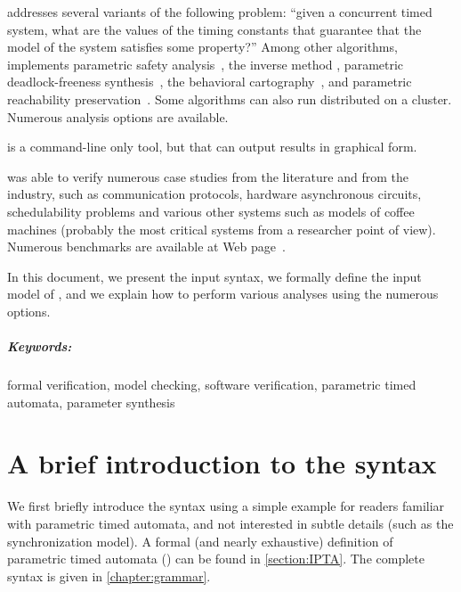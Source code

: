 \imitator{} addresses several variants of the following problem:
``given a concurrent timed system, what are the values of the timing constants that guarantee that the model of the system satisfies some property?''
Among other algorithms, \imitator{} implements
parametric safety analysis~\cite{AHV93,JLR15},
the inverse method \cite{ACEF09,AM15},
parametric deadlock-freeness synthesis~\cite{Andre16},
the behavioral cartography~\cite{AF10},
and
parametric reachability preservation~\cite{ALNS15}.
Some algorithms can also run distributed on a cluster.
Numerous analysis options are available.

\imitator{} is a command-line only tool, but that can output results in graphical form.

\imitator{} was able to verify numerous case studies from the literature and from the industry, such as communication protocols, hardware asynchronous circuits, schedulability problems and various other systems such as models of coffee machines (probably the most critical systems from a researcher point of view).
Numerous benchmarks are available at \imitator{} Web page~\cite{imitator}.

In this document, we present the input syntax, we formally define the input model of \imitator{}, and we explain how to perform various analyses using the numerous options.


\paragraph{Keywords:} formal verification, model checking, software verification, parametric timed automata, parameter synthesis



\chapter{A brief introduction to the syntax}\label{chapter:syntax-introduction}

We first briefly introduce the syntax using a simple example for readers familiar with parametric timed automata, and not interested in subtle details (such as the synchronization model).
A formal (and nearly exhaustive) definition of \imitator{} parametric timed automata (\NIPTA{}) can be found in \cref{section:IPTA}.
The complete syntax is given in \cref{chapter:grammar}.


